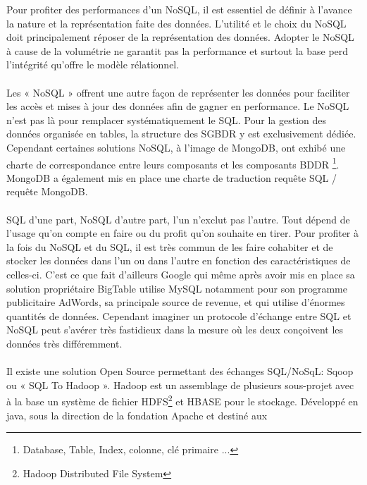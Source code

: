 Pour profiter des performances d'un \textsf{NoSQL}, il est essentiel
de définir à l'avance la nature et la représentation faite des données.
L'utilité et le choix du \textsf{NoSQL} doit principalement
réposer de la représentation des données. Adopter le \textsf{NoSQL} à
cause de la volumétrie ne garantit pas la performance et surtout la 
base perd l'intégrité qu'offre le modèle rélationnel.  
\\ 
\\ 
Les « \textsf{NoSQL} » offrent une autre façon
de représenter les données pour faciliter les accès et mises à jour des
données afin de gagner en performance. Le \textsf{NoSQL} n'est pas 
là pour remplacer systématiquement le  \textsf{SQL}. Pour la gestion des données 
organisée en tables, la structure des \textsf{SGBDR} y est exclusivement
dédiée. Cependant certaines solutions \textsf{NoSQL}, à l'image de \textsf{MongoDB}, ont
exhibé une charte de correspondance entre leurs composants et les composants \textsf{BDDR} 
\footnote{Database, Table, Index, colonne, clé
  primaire ...}. \textsf{MongoDB} a également mis
en place une charte de traduction requête \textsf{SQL} / requête
\textsf{MongoDB}.
\\
\\
\textsf{SQL} d'une part, \textsf{NoSQL} d'autre part, l'un n'exclut pas l'autre.
Tout dépend de l'usage qu'on compte en faire ou du profit qu'on
souhaite en tirer. Pour profiter à la fois du \textsf{NoSQL} et du \textsf{SQL}, il est très commun
de les faire cohabiter et de stocker
les données dans l'un ou dans l'autre en fonction des caractéristiques de 
celles-ci. C'est ce que fait d'ailleurs \textsf{Google} qui
même après avoir mis en place sa solution
propriétaire \textsf{BigTable} utilise \textsf{MySQL}
notamment pour son programme publicitaire \textsf{AdWords}, sa
principale source de revenue, et qui utilise d'énormes quantités de
données. Cependant imaginer un protocole d'échange entre \textsf{SQL}
et \textsf{NoSQL} peut s'avérer très fastidieux dans la mesure où les
deux conçoivent les données très différemment.
\\
\\
Il existe une solution \textsf{Open Source} permettant des échanges
\textsf{SQL}/\textsf{NoSqL}: \textsf{Sqoop} ou « SQL To Hadoop
». \textsf{Hadoop} est un assemblage de plusieurs
sous-projet avec à la base un système de
fichier \textsf{HDFS}\footnote{Hadoop Distributed File System}
et \textsf{HBASE} pour le stockage. Développé en \textsf{java}, sous
la direction de la fondation \textsf{Apache} et destiné aux

